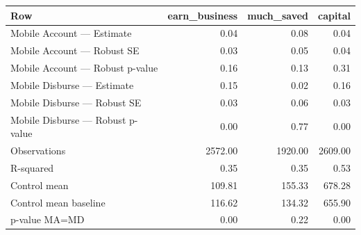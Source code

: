 
\begin{tabular}{lrrr}
\toprule
Row & earn\_business & much\_saved & capital\\
\midrule
Mobile Account — Estimate & 0.04 & 0.08 & 0.04\\
Mobile Account — Robust SE & 0.03 & 0.05 & 0.04\\
Mobile Account — Robust p-value & 0.16 & 0.13 & 0.31\\
Mobile Disburse — Estimate & 0.15 & 0.02 & 0.16\\
Mobile Disburse — Robust SE & 0.03 & 0.06 & 0.03\\
\addlinespace
Mobile Disburse — Robust p-value & 0.00 & 0.77 & 0.00\\
Observations & 2572.00 & 1920.00 & 2609.00\\
R-squared & 0.35 & 0.35 & 0.53\\
Control mean & 109.81 & 155.33 & 678.28\\
Control mean baseline & 116.62 & 134.32 & 655.90\\
\addlinespace
p-value MA=MD & 0.00 & 0.22 & 0.00\\
\bottomrule
\end{tabular}
